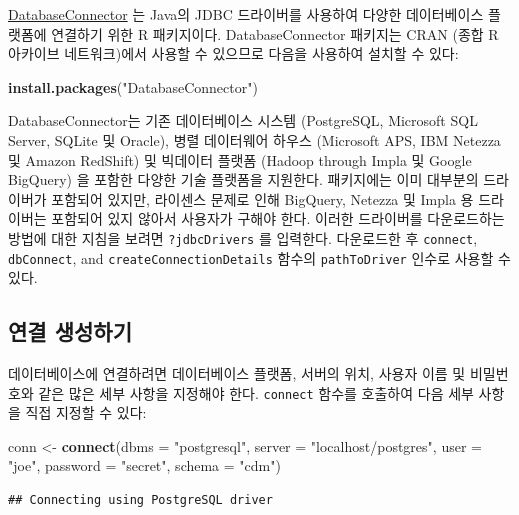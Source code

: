 \documentclass[10.5pt]{book}
\newenvironment{Shaded}{\begin{snugshade}}{\end{snugshade}}
\newcommand{\KeywordTok}[1]{\textcolor[rgb]{0.13,0.29,0.53}{\textbf{#1}}}
\newcommand{\DataTypeTok}[1]{\textcolor[rgb]{0.13,0.29,0.53}{#1}}
\newcommand{\StringTok}[1]{\textcolor[rgb]{0.31,0.60,0.02}{#1}}
\newcommand{\NormalTok}[1]{#1}
\theoremstyle{definition}
\theoremstyle{definition}
\theoremstyle{definition}
\theoremstyle{remark}
\begin{document}
\href{https://ohdsi.github.io/DatabaseConnector/}{DatabaseConnector} 는
Java의 JDBC 드라이버를 사용하여 다양한 데이터베이스 플랫폼에 연결하기
위한 R 패키지이다. DatabaseConnector 패키지는 CRAN (종합 R 아카이브
네트워크)에서 사용할 수 있으므로 다음을 사용하여 설치할 수 있다:

\begin{Shaded}
\begin{Highlighting}[]
\KeywordTok{install.packages}\NormalTok{(}\StringTok{"DatabaseConnector"}\NormalTok{)}
\end{Highlighting}
\end{Shaded}

DatabaseConnector는 기존 데이터베이스 시스템 (PostgreSQL, Microsoft SQL
Server, SQLite 및 Oracle), 병렬 데이터웨어 하우스 (Microsoft APS, IBM
Netezza 및 Amazon RedShift) 및 빅데이터 플랫폼 (Hadoop through Impla 및
Google BigQuery) 을 포함한 다양한 기술 플랫폼을 지원한다. 패키지에는
이미 대부분의 드라이버가 포함되어 있지만, 라이센스 문제로 인해 BigQuery,
Netezza 및 Impla 용 드라이버는 포함되어 있지 않아서 사용자가 구해야
한다. 이러한 드라이버를 다운로드하는 방법에 대한 지침을 보려면
\texttt{?jdbcDrivers} 를 입력한다. 다운로드한 후 \texttt{connect},
\texttt{dbConnect}, and \texttt{createConnectionDetails} 함수의
\texttt{pathToDriver} 인수로 사용할 수 있다.

\subsection{연결 생성하기}\label{-}

데이터베이스에 연결하려면 데이터베이스 플랫폼, 서버의 위치, 사용자 이름
및 비밀번호와 같은 많은 세부 사항을 지정해야 한다. \texttt{connect}
함수를 호출하여 다음 세부 사항을 직접 지정할 수 있다:

\begin{Shaded}
\begin{Highlighting}[]
\NormalTok{conn <-}\StringTok{ }\KeywordTok{connect}\NormalTok{(}\DataTypeTok{dbms =} \StringTok{"postgresql"}\NormalTok{,}
                \DataTypeTok{server =} \StringTok{"localhost/postgres"}\NormalTok{,}
                \DataTypeTok{user =} \StringTok{"joe"}\NormalTok{,}
                \DataTypeTok{password =} \StringTok{"secret"}\NormalTok{,}
                \DataTypeTok{schema =} \StringTok{"cdm"}\NormalTok{)}
\end{Highlighting}
\end{Shaded}

\begin{verbatim}
## Connecting using PostgreSQL driver
\end{verbatim}
\end{document}
